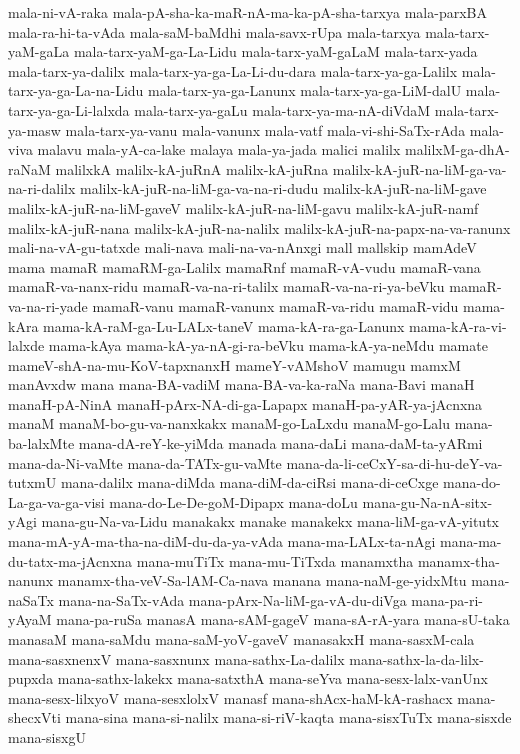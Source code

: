 {mala-ni-vA-raka
mala-pA-sha-ka-maR-nA-ma-ka-pA-sha-tarxya
mala-parxBA
mala-ra-hi-ta-vAda
mala-saM-baMdhi
mala-savx-rUpa
mala-tarxya
mala-tarx-yaM-gaLa
mala-tarx-yaM-ga-La-Lidu
mala-tarx-yaM-gaLaM
mala-tarx-yada
mala-tarx-ya-dalilx
mala-tarx-ya-ga-La-Li-du-dara
mala-tarx-ya-ga-Lalilx
mala-tarx-ya-ga-La-na-Lidu
mala-tarx-ya-ga-Lanunx
mala-tarx-ya-ga-LiM-dalU
mala-tarx-ya-ga-Li-lalxda
mala-tarx-ya-gaLu
mala-tarx-ya-ma-nA-diVdaM
mala-tarx-ya-masw
mala-tarx-ya-vanu
mala-vanunx
mala-vatf
mala-vi-shi-SaTx-rAda
mala-viva
malavu
mala-yA-ca-lake
malaya
mala-ya-jada
malici
malilx
malilxM-ga-dhA-raNaM
malilxkA
malilx-kA-juRnA
malilx-kA-juRna
malilx-kA-juR-na-liM-ga-va-na-ri-dalilx
malilx-kA-juR-na-liM-ga-va-na-ri-dudu
malilx-kA-juR-na-liM-gave
malilx-kA-juR-na-liM-gaveV
malilx-kA-juR-na-liM-gavu
malilx-kA-juR-namf
malilx-kA-juR-nana
malilx-kA-juR-na-nalilx
malilx-kA-juR-na-papx-na-va-ranunx
mali-na-vA-gu-tatxde
mali-nava
mali-na-va-nAnxgi
mall
mallskip
mamAdeV
mama
mamaR
mamaRM-ga-Lalilx
mamaRnf
mamaR-vA-vudu
mamaR-vana
mamaR-va-nanx-ridu
mamaR-va-na-ri-talilx
mamaR-va-na-ri-ya-beVku
mamaR-va-na-ri-yade
mamaR-vanu
mamaR-vanunx
mamaR-va-ridu
mamaR-vidu
mama-kAra
mama-kA-raM-ga-Lu-LALx-taneV
mama-kA-ra-ga-Lanunx
mama-kA-ra-vi-lalxde
mama-kAya
mama-kA-ya-nA-gi-ra-beVku
mama-kA-ya-neMdu
mamate
mameV-shA-na-mu-KoV-tapxnanxH
mameY-vAMshoV
mamugu
mamxM
manAvxdw
mana
mana-BA-vadiM
mana-BA-va-ka-raNa
mana-Bavi
manaH
manaH-pA-NinA
manaH-pArx-NA-di-ga-Lapapx
manaH-pa-yAR-ya-jAcnxna
manaM
manaM-bo-gu-va-nanxkakx
manaM-go-LaLxdu
manaM-go-Lalu
mana-ba-lalxMte
mana-dA-reY-ke-yiMda
manada
mana-daLi
mana-daM-ta-yARmi
mana-da-Ni-vaMte
mana-da-TATx-gu-vaMte
mana-da-li-ceCxY-sa-di-hu-deY-va-tutxmU
mana-dalilx
mana-diMda
mana-diM-da-ciRsi
mana-di-ceCxge
mana-do-La-ga-va-ga-visi
mana-do-Le-De-goM-Dipapx
mana-doLu
mana-gu-Na-nA-sitx-yAgi
mana-gu-Na-va-Lidu
manakakx
manake
manakekx
mana-liM-ga-vA-yitutx
mana-mA-yA-ma-tha-na-diM-du-da-ya-vAda
mana-ma-LALx-ta-nAgi
mana-ma-du-tatx-ma-jAcnxna
mana-muTiTx
mana-mu-TiTxda
manamxtha
manamx-tha-nanunx
manamx-tha-veV-Sa-lAM-Ca-nava
manana
mana-naM-ge-yidxMtu
mana-naSaTx
mana-na-SaTx-vAda
mana-pArx-Na-liM-ga-vA-du-diVga
mana-pa-ri-yAyaM
mana-pa-ruSa
manasA
mana-sAM-gageV
mana-sA-rA-yara
mana-sU-taka
manasaM
mana-saMdu
mana-saM-yoV-gaveV
manasakxH
mana-sasxM-cala
mana-sasxnenxV
mana-sasxnunx
mana-sathx-La-dalilx
mana-sathx-la-da-lilx-pupxda
mana-sathx-lakekx
mana-satxthA
mana-seYva
mana-sesx-lalx-vanUnx
mana-sesx-lilxyoV
mana-sesxlolxV
manasf
mana-shAcx-haM-kA-rashacx
mana-shecxVti
mana-sina
mana-si-nalilx
mana-si-riV-kaqta
mana-sisxTuTx
mana-sisxde
mana-sisxgU
}
